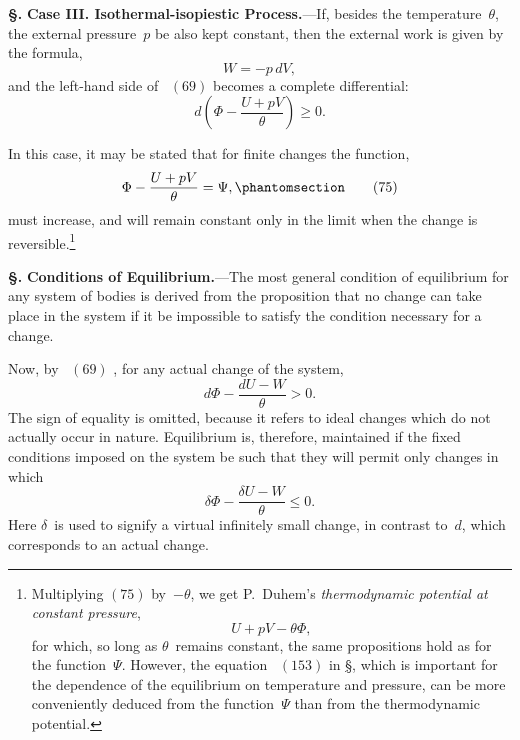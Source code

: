 \documentclass[12pt]{book}[2005/09/16]
\newcommand{\Chg}[2]{#2}
\newcommand{\Add}[1]{\Chg{}{#1}}
\newcommand{\Section}[1]{
  \medskip\par\textbf{§\;#1}
  \label{section:#1}
}
\newcommand{\SecRef}[2][§\;]{\hyperref[section:#2.]{{\upshape #1#2}}}
\newcommand{\Tag}[1]{%
  \phantomsection\label{eqn:#1}\tag*{\ensuremath{#1}}%
}
\newcommand{\Eq}[1]{%
  \hyperref[eqn:#1]{\ensuremath{#1}}%
}
\newcommand{\PageSep}[1]{\ignorespaces}
\newcommand{\Topic}[1]{\textbf{#1}}
\begin{document}
\Section{147.} \Topic{Case III\@. Isothermal-isopiestic Process.}---If,
%
besides the temperature~$\theta$, the external pressure~$p$ be
also kept constant, then the external work is given by the
formula,
\[
W = -p\, dV,
\]
and the left-hand side of~\Eq{(69)} becomes a complete differential:
\[
d\left(\Phi - \frac{U + pV}{\theta}\right) \geq 0\Add{.}
\]

In this case, it may be stated that for finite changes the
%
function,
\[
\Phi - \frac{U + pV}{\theta} = \Psi,
\Tag{(75)}
\]
\PageSep{115}
must increase, and will remain constant only in the limit
%
%
%
when the change is reversible.\footnote
  {Multiplying \Eq{(75)} by~$-\theta$, we get P.~Duhem's \emph{thermodynamic potential at
  constant pressure},
  \[
  U + pV - \theta\Phi,
  \]
  for which, so long as $\theta$~remains constant, the same propositions hold as for
  the function~$\Psi$. However, the equation~\Eq{(153)} in \SecRef{211}, which is important
  for the dependence of the equilibrium on temperature and pressure, can be
%
  more conveniently deduced from the function~$\Psi$ than from the thermodynamic
  potential.}

\Section{148.} \Topic{Conditions of Equilibrium.}---The most general
%
condition of equilibrium for any system of bodies is derived
from the proposition that no change can take place in the
system if it be impossible to satisfy the condition necessary
for a change.

Now, by~\Eq{(69)}, for any actual change of the system,
\[
d\Phi - \frac{dU - W}{\theta} > 0.
\]
The sign of equality is omitted, because it refers to ideal
changes which do not actually occur in nature. Equilibrium
is, therefore, maintained if the fixed conditions imposed on
the system be such that they will permit only changes in
which
\[
\delta\Phi - \frac{\delta U - W}{\theta} \leq 0.
\]
Here $\delta$~is used to signify a virtual infinitely small change,
in contrast to~$d$, which corresponds to an actual change.
\end{document}
